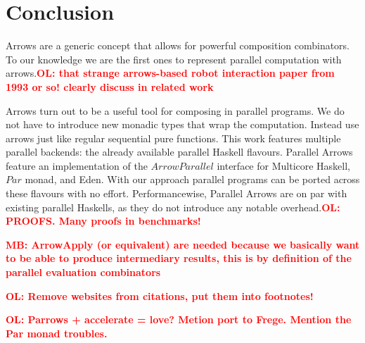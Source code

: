 \documentclass{jfp1}
\newcommand{\Conid}[1]{\mathit{#1}}
\newcommand{\comm}[2]{\textcolor{red}{\bfseries #1: #2}}
\newcommand{\olcomment}[1]{\comm{OL}{#1}}
\newcommand{\mbcomment}[1]{\comm{MB}{#1}}
\begin{document}


	\section{Conclusion}
\label{sec:conclusion}
Arrows are a generic concept that allows for powerful composition combinators. To our knowledge we are the first ones to represent parallel computation with arrows.\olcomment{that strange arrows-based robot interaction paper from 1993 or so! clearly discuss in related work}

Arrows turn out to be a useful tool for composing in parallel programs. We do not have to introduce new monadic types that wrap the computation. Instead use arrows just like regular sequential pure functions. 
%
This work features multiple parallel backends: the already available parallel Haskell flavours. Parallel Arrows feature an implementation of the \ensuremath{\Conid{ArrowParallel}} interface for Multicore Haskell, \ensuremath{\Conid{Par}} monad, and Eden. With our approach parallel programs can be ported across these flavours with no effort.
%
%
Performancewise, Parallel Arrows are on par with existing parallel Haskells, as they do not introduce any notable overhead.\olcomment{PROOFS. Many proofs in benchmarks!}

\mbcomment{ArrowApply (or equivalent) are needed because we basically want to be able to produce intermediary results, this is by definition of the parallel evaluation combinators}

\olcomment{Remove websites from citations, put them into footnotes!}

\olcomment{Parrows + accelerate = love? Metion port to Frege. Mention the Par monad troubles.}
        
	
        \appendix
\end{document}
